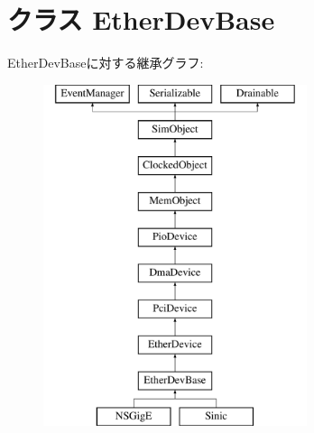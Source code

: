 \hypertarget{classEthernet_1_1EtherDevBase}{
\section{クラス EtherDevBase}
\label{classEthernet_1_1EtherDevBase}
}
EtherDevBaseに対する継承グラフ:\begin{figure}[H]
\begin{center}
\leavevmode
\includegraphics[height=10cm]{classEthernet_1_1EtherDevBase}
\end{center}
\end{figure}

